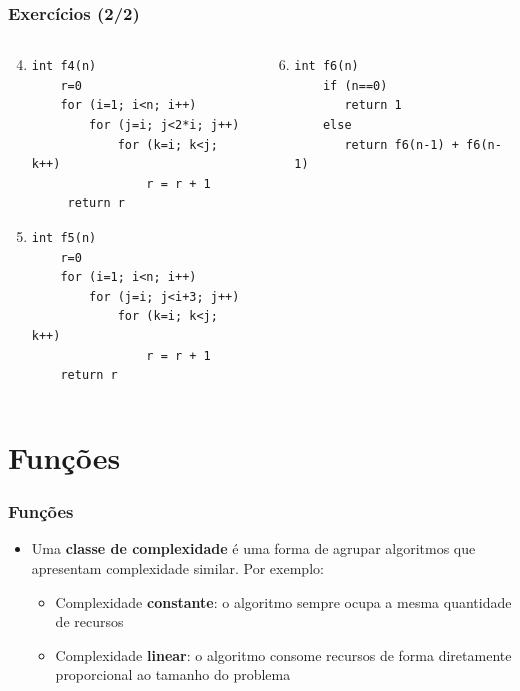 \documentclass[aspectratio=169]{beamer}
\begin{document}
\begin{frame}[fragile]\frametitle{Exercícios (2/2)}
\begin{columns}[T]
\begin{column}{0.5\linewidth}
\begin{enumerate}
\setcounter{enumi}{3}
	\item
{\small
\begin{verbatim}
int f4(n)
    r=0
    for (i=1; i<n; i++)
        for (j=i; j<2*i; j++)
            for (k=i; k<j; k++)
                r = r + 1
     return r
\end{verbatim}
}
	\item
{\small
\begin{verbatim}
int f5(n)
    r=0
    for (i=1; i<n; i++)
        for (j=i; j<i+3; j++)
            for (k=i; k<j; k++)
                r = r + 1
    return r
\end{verbatim}
}
\end{enumerate}
\end{column}
\begin{column}{0.5\linewidth}
\begin{enumerate}
\setcounter{enumi}{5}
	\item
{\small
\begin{verbatim}
int f6(n)
    if (n==0)
       return 1
    else
       return f6(n-1) + f6(n-1)
\end{verbatim}
}
\end{enumerate}
\end{column}
\end{columns}
\end{frame}

\section{Funções}

\begin{frame}\frametitle{Funções}
\begin{itemize}
	\item Uma \textbf{classe de complexidade} é uma forma de agrupar algoritmos que apresentam complexidade similar. Por exemplo:
	\begin{itemize}
		\item Complexidade \textbf{constante}: o algoritmo sempre ocupa a mesma quantidade de recursos
		\item Complexidade \textbf{linear}: o algoritmo consome recursos de forma diretamente proporcional ao tamanho do problema
	\end{itemize}
\end{itemize}
\end{frame}
\end{document}
